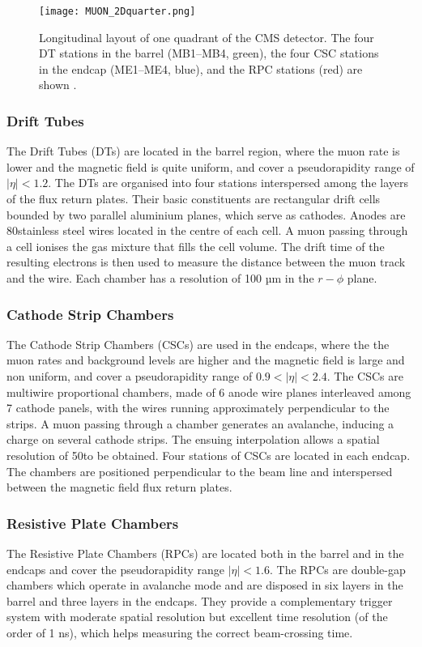 \begin{figure}[thb]
  \centering
  \texttt{[image: MUON\_2Dquarter.png]}
  \caption{Longitudinal layout of one quadrant of the CMS detector.
    The four DT stations in the barrel (MB1–MB4, green),
    the four CSC stations in the endcap (ME1–ME4, blue),
    and the RPC stations (red) are shown \cite{collaboration_2012}.}
  \label{fig:MUON_2Dquarter}
\end{figure}

\subsubsection{Drift Tubes}
The Drift Tubes (DTs) are located in the barrel region, where the muon rate is lower and the magnetic field is quite uniform,
and cover a pseudorapidity range of $|\eta| < 1.2$.
The DTs are organised into four stations interspersed among the layers of the flux return plates.
Their basic constituents are rectangular drift cells bounded by two parallel aluminium planes, which serve as cathodes.
Anodes are 80\mum stainless steel wires located in the centre of each cell.
A muon passing through a cell ionises the gas mixture that fills the cell volume.
The drift time of the resulting electrons is then used to measure the distance between the muon track and the wire.
Each chamber has a resolution of 100 µm in the $r - \phi$ plane.

\subsubsection{Cathode Strip Chambers}
The Cathode Strip Chambers (CSCs) are used in the endcaps, where the the muon rates and background levels are higher and the magnetic field is large and non uniform,
and cover a pseudorapidity range of $0.9 < |\eta| < 2.4$.
The CSCs are multiwire proportional chambers, made of 6 anode wire planes interleaved among 7 cathode panels,
with the wires running approximately perpendicular to the strips.
A muon passing through a chamber generates an avalanche, inducing a charge on several cathode strips.
The ensuing interpolation allows a spatial resolution of 50\mum to be obtained.
Four stations of CSCs are located in each endcap.
The chambers are positioned perpendicular to the beam line and interspersed between the magnetic field flux return plates.

\subsubsection{Resistive Plate Chambers}
The Resistive Plate Chambers (RPCs) are located both in the barrel and in the endcaps and cover the pseudorapidity range $|\eta| < 1.6$.
The RPCs are double-gap chambers which operate in avalanche mode and are disposed in six layers in the barrel and three layers in the endcaps.
They provide a complementary trigger system with moderate spatial resolution but excellent time resolution (of the order of 1 ns),
which helps measuring the correct beam-crossing time.

